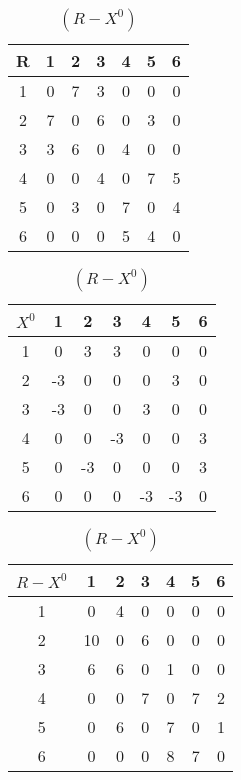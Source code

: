 \begin{table}[h!]
  \scriptsize

  \centering
  
  \begin{minipage}{0.32\textwidth}
    \centering

    \caption{$(R)$}

    \label{tab:R}

    \begin{tabular}{|c|cccccc|} 
      \hline
      R&1&2&3&4&5&6 \\ \hline
      1&0&7&3&0&0&0 \\ 
      2&7&0&6&0&3&0 \\ 
      3&3&6&0&4&0&0 \\ 
      4&0&0&4&0&7&5 \\ 
      5&0&3&0&7&0&4 \\ 
      6&0&0&0&5&4&0 \\ \hline
    \end{tabular}
  \end{minipage}
  \begin{minipage}{0.32\textwidth}
    \centering

    \caption{$(X^0)$}

    \label{tab:X0}

    \begin{tabular}{|c|cccccc|} 
      \hline
      $X^0$&1&2&3&4&5&6 \\ \hline
      1&0 & 3& 3& 0& 0&0 \\ 
      2&-3& 0& 0& 0& 3&0 \\ 
      3&-3& 0& 0& 3& 0&0 \\ 
      4&0 & 0&-3& 0& 0&3 \\ 
      5&0 &-3& 0& 0& 0&3 \\ 
      6&0 & 0& 0&-3&-3&0 \\ \hline
    \end{tabular}
  \end{minipage}
  \begin{minipage}{0.32\textwidth}
    \centering

    \caption{$(R - X^0)$}

    \label{tab:RX0}

    \begin{tabular}{|c|cccccc|} 
      \hline
      $R-X^0$&1&2&3&4&5&6 \\ \hline
      1&0 & 4& 0& 0& 0&0 \\ 
      2&10& 0& 6& 0& 0&0 \\ 
      3& 6& 6& 0& 1& 0&0 \\ 
      4&0 & 0& 7& 0& 7&2 \\ 
      5&0 & 6& 0& 7& 0&1 \\ 
      6&0 & 0& 0& 8& 7&0 \\ \hline
    \end{tabular}
  \end{minipage}

\end{table}

